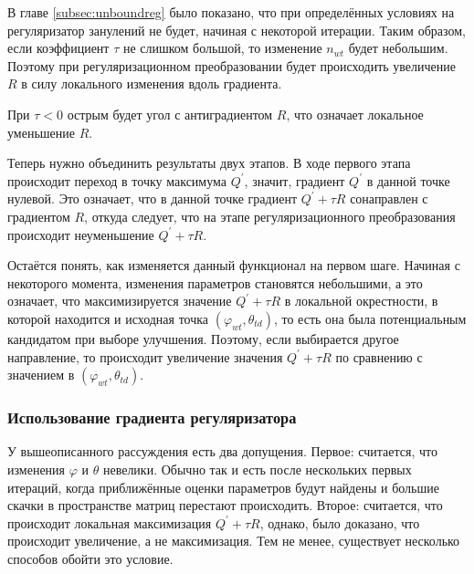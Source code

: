 \documentclass[12pt]{article}
\renewcommand{\phi}{\varphi}
\begin{document}
В главе \ref{subsec:unboundreg} было показано, что при определённых условиях на регуляризатор занулений не будет, начиная с некоторой итерации. Таким образом, если коэффициент $\tau$ не слишком большой, то изменение $n_{wt}$ будет небольшим. Поэтому при регуляризационном преобразовании будет происходить увеличение $R$ в силу локального изменения вдоль градиента.

При $\tau < 0$ острым будет угол с антиградиентом $R$, что означает локальное уменьшение $R$.

Теперь нужно объединить результаты двух этапов. В ходе первого этапа происходит переход в точку максимума $Q^{\prime}$, значит, градиент $Q^{\prime}$ в данной точке нулевой. Это означает, что в данной точке градиент $Q^{\prime} + \tau R$ сонаправлен с градиентом $R$, откуда следует, что на этапе регуляризационного преобразования происходит неуменьшение $Q^{\prime} + \tau R$. 

Остаётся понять, как изменяется данный функционал на первом шаге. Начиная с некоторого момента, изменения параметров становятся небольшими, а это означает, что максимизируется значение $Q^{\prime} + \tau R$ в локальной окрестности, в которой находится и исходная точка $(\phi_{wt}, \theta_{td})$, то есть она была потенциальным кандидатом при выборе улучшения. Поэтому, если выбирается другое направление, то происходит увеличение значения $Q^{\prime} + \tau R$ по сравнению с значением в $(\phi_{wt}, \theta_{td})$.

\subsubsection{Использование градиента регуляризатора}
\label{subsec:gradientuse}
У вышеописанного рассуждения есть два допущения. Первое: считается, что изменения $\phi$ и $\theta$ невелики. Обычно так и есть после нескольких первых итераций, когда приближённые оценки параметров будут найдены и большие скачки в пространстве матриц перестают происходить. Второе: считается, что происходит локальная максимизация $Q^{\prime} + \tau R$, однако, было доказано, что происходит увеличение, а не максимизация. Тем не менее, существует несколько способов обойти это условие. 
\end{document}
